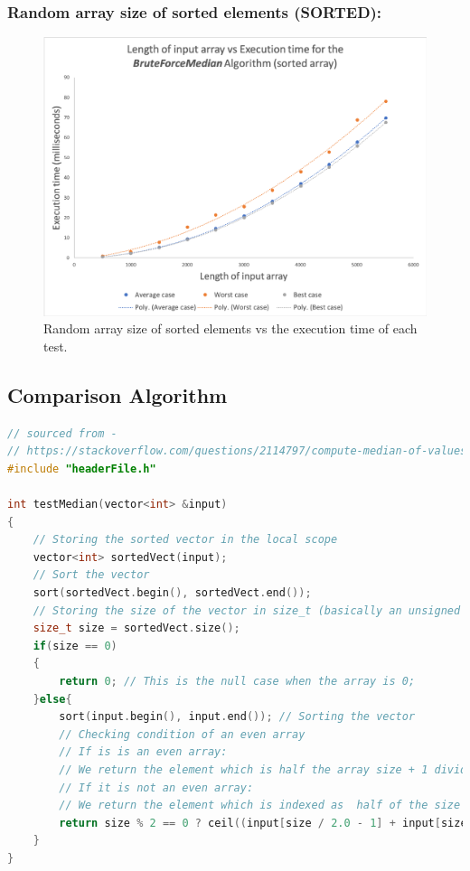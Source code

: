 \documentclass[12pt]{article}
\begin{document}
\subsubsection{Random array size of sorted elements (SORTED): }

\begin{figure}[H]
	\centering
	\includegraphics[width=0.9\linewidth]{Results/TimeSorted}
	\caption{Random array size of sorted elements vs the execution time of each test.}
	\label{fig:timesorted}
\end{figure}


\subsection{Comparison Algorithm}

\begin{lstlisting}[caption={Comparison algorithm used to compared the output from the \textbf{\textit{BruteForceMedian}} algorithm. Stored in the \textit{"comparisonAlgorithm.cpp" file.}},label={lst:comparison},language=C++,]
// sourced from - 
// https://stackoverflow.com/questions/2114797/compute-median-of-values-stored-in-vector-c/2114817#2114817
#include "headerFile.h"

int testMedian(vector<int> &input)
{
	// Storing the sorted vector in the local scope
	vector<int> sortedVect(input); 
	// Sort the vector
	sort(sortedVect.begin(), sortedVect.end());
	// Storing the size of the vector in size_t (basically an unsigned int)
	size_t size = sortedVect.size(); 
	if(size == 0)
	{
		return 0; // This is the null case when the array is 0;
	}else{
		sort(input.begin(), input.end()); // Sorting the vector
		// Checking condition of an even array
		// If is is an even array:
		// We return the element which is half the array size + 1 divided by two
		// If it is not an even array:
		// We return the element which is indexed as  half of the size of the array
		return size % 2 == 0 ? ceil((input[size / 2.0 - 1] + input[size / 2.0]) / 2.0) : input[size / 2];
	}
}

\end{lstlisting}
\end{document}
